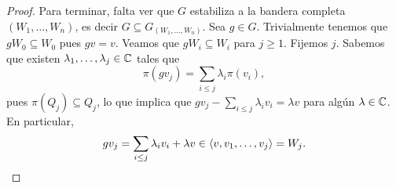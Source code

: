 \begin{proof}
	Para terminar, falta ver que $G$ estabiliza a la bandera completa 
	$(W_1,\dots,W_n)$, es decir $G\subseteq G_{(W_1,\dots,W_n)}$. Sea $g\in G$. Trivialmente tenemos que 
	$gW_0\subseteq W_0$ pues $gv=v$. Veamos que $gW_i\subseteq W_i$ para $j\geq 1$. Fijemos $j$. Sabemos que 
	existen $\lambda_1,\dots,\lambda_j\in\mathbb{C}$ tales que 
	\[
	\pi(gv_j)=\sum_{i\leq j}\lambda_i\pi(v_i),
	\]
	pues $\pi(Q_j)\subseteq Q_j$, 
	lo que implica que $gv_j-\sum_{i\leq j}\lambda_iv_i=\lambda v$ para algún $\lambda\in\mathbb{C}$. En particular, 
	\[
	gv_j=\sum_{i\leq j}\lambda_iv_i+\lambda v\in \langle v,v_1,\dots,v_j\rangle=W_j.	\qedhere
	\]
\end{proof}

